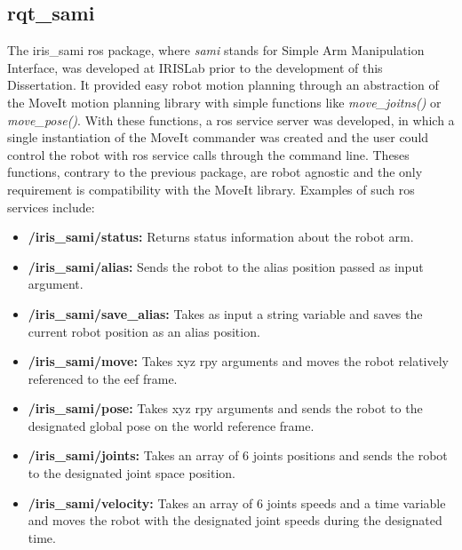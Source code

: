 \subsection{rqt\_sami}

\par The iris\_sami \ac{ros} package, where \textit{sami} stands for Simple Arm Manipulation Interface, was developed at IRISLab prior to the development of this Dissertation. It provided easy robot motion planning through an abstraction of the MoveIt motion planning library with simple functions like \textit{move\_joitns()} or \textit{move\_pose()}. With these functions, a \ac{ros} service server was developed, in which a single instantiation of the MoveIt commander was created and the user could control the robot with \ac{ros} service calls through the command line. Theses functions, contrary to the previous package, are robot agnostic and the only requirement is compatibility with the MoveIt library. Examples of such \ac{ros} services include:


\begin{itemize}
    \item \textbf{/iris\_sami/status: } Returns status information about the robot arm.
    \item \textbf{/iris\_sami/alias: } Sends the robot to the alias position passed as input argument.
    \item \textbf{/iris\_sami/save\_alias: } Takes as input a string variable and saves the current robot position as an alias position.
    \item \textbf{/iris\_sami/move: } Takes \ac{xyz} \ac{rpy} arguments and moves the robot relatively referenced to the \ac{eef} frame.
    \item \textbf{/iris\_sami/pose: } Takes \ac{xyz} \ac{rpy} arguments and sends the robot to the designated global pose on the world reference frame.
    \item \textbf{/iris\_sami/joints: } Takes an array of 6 joints positions and sends the robot to the designated joint space position.
    \item \textbf{/iris\_sami/velocity: } Takes an array of 6 joints speeds and a time variable and moves the robot with the designated joint speeds during the designated time.
\end{itemize}

